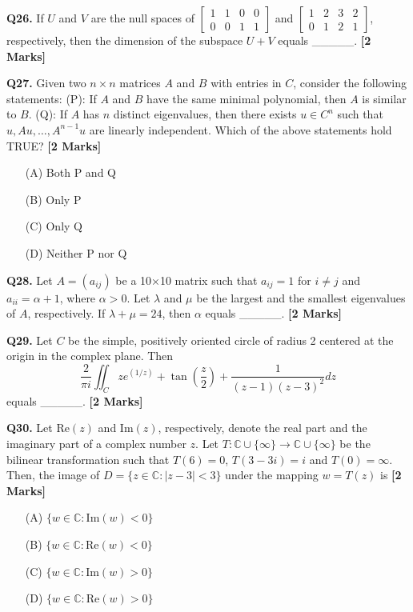 \documentclass[11pt]{article}
\newcommand{\questionb}[2]{
    \noindent\textbf{Q#2.} #1 \hfill \textbf{[2 Marks]}
}
\begin{document}
\questionb{If \(U\) and \(V\) are the null spaces of \(\begin{bmatrix} 1 & 1 & 0 & 0 \\ 0 & 0 & 1 & 1 \end{bmatrix}\) and \(\begin{bmatrix} 1 & 2 & 3 & 2 \\ 0 & 1 & 2 & 1 \end{bmatrix}\), respectively, then the dimension of the subspace \(U + V\) equals \_\_\_\_\_.}{26}
\vspace{0.5cm}

\questionb{Given two \( n \times n \) matrices \( A \) and \( B \) with entries in \( C \), consider the following statements:
(P): If \( A \) and \( B \) have the same minimal polynomial, then \( A \) is similar to \( B \).
(Q): If \( A \) has \( n \) distinct eigenvalues, then there exists \( u \in C^n \) such that \( u, Au, \ldots, A^{n-1}u \) are linearly independent.
Which of the above statements hold TRUE?}{27}
\begin{enumerate}
    \item[(A)] Both P and Q  
    \item[(B)] Only P  
    \item[(C)] Only Q  
    \item[(D)] Neither P nor Q  
\end{enumerate}
\vspace{0.5cm}

\questionb{Let \( A = (a_{ij}) \) be a 10×10 matrix such that \( a_{ij} = 1 \) for \( i \neq j \) and \( a_{ii} = \alpha + 1 \), where \( \alpha > 0 \). Let \( \lambda \) and \( \mu \) be the largest and the smallest eigenvalues of \( A \), respectively. If \( \lambda + \mu = 24 \), then \( \alpha \) equals \_\_\_\_\_.}{28}
\vspace{0.5cm}

\questionb{Let \( C \) be the simple, positively oriented circle of radius 2 centered at the origin in the complex plane. Then
\[\frac{2}{\pi i} \iint_C z e^{(1/z)} + \tan \left( \frac{z}{2} \right) + \frac{1}{(z-1)(z-3)^2} dz\]
equals \_\_\_\_\_.}{29}
\vspace{0.5cm}

\questionb{Let \( \text{Re}(z) \) and \( \text{Im}(z) \), respectively, denote the real part and the imaginary part of a complex number \( z \). Let \( T: \mathbb{C} \cup \{\infty\} \to \mathbb{C} \cup \{\infty\} \) be the bilinear transformation such that \( T(6) = 0 \), \( T(3-3i) = i \) and \( T(0) = \infty \). Then, the image of \( D = \{z \in \mathbb{C}: |z-3| < 3\} \) under the mapping \( w = T(z) \) is}{30}
\begin{enumerate}
    \item[(A)] \(\{w \in \mathbb{C}: \text{Im}(w) < 0\}\)  
    \item[(B)] \(\{w \in \mathbb{C}: \text{Re}(w) < 0\}\)  
    \item[(C)] \(\{w \in \mathbb{C}: \text{Im}(w) > 0\}\)  
    \item[(D)] \(\{w \in \mathbb{C}: \text{Re}(w) > 0\}\)  
\end{enumerate}
\vspace{0.5cm}
\end{document}
